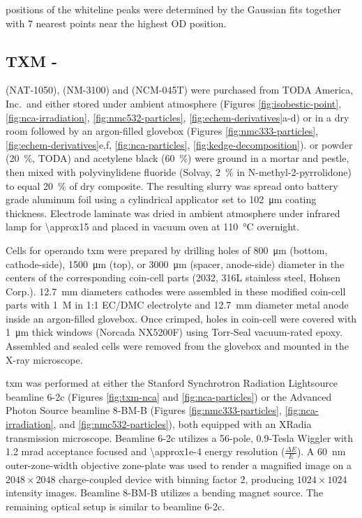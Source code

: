 \documentclass{article}
\begin{document}
positions of the whiteline peaks were determined by the Gaussian fits together with 7 nearest points near the highest OD position.

\subsection{TXM - \nmc{}}

\nca{} (NAT-1050), \nmc[333]{} (NM-3100) and \nmc[532]{} (NCM-045T)
were purchased from TODA America, Inc.\ and either stored under
ambient atmosphere (Figures \ref{fig:isobestic-point},
\ref{fig:nca-irradiation}, \ref{fig:nmc532-particles},
\ref{fig:echem-derivatives}a-d) or in a dry room followed by an
argon-filled glovebox (Figures \ref{fig:nmc333-particles},
\ref{fig:echem-derivatives}e,f, \ref{fig:nca-particles},
\ref{fig:kedge-decomposition}). \nca{} or \nmc{} powder
(\SI{20}{\percent}, TODA) and acetylene black (\SI{60}{\percent}) were
ground in a mortar and pestle, then mixed with polyvinylidene fluoride
(Solvay, \SI{2}{\percent} in N-methyl-2-pyrrolidone) to equal
\SI{20}{\percent} of dry composite. The resulting slurry was spread
onto battery grade aluminum foil using a cylindrical applicator set to
\SI{102}{\micro\meter} coating thickness. Electrode laminate was dried
in ambient atmosphere under infrared lamp for \SI{\approx15}{\min} and
placed in vacuum oven at \SI{110}{\celsius} overnight.

Cells for operando \gls{txm} were prepared by drilling holes of
\SI{800}{\micro\meter} (bottom, cathode-side), \SI{1500}{\micro\meter}
(top), or \SI{3000}{\micro\meter} (spacer, anode-side) diameter in the
centers of the corresponding coin-cell parts (2032, 316L stainless
steel, Hohsen Corp.). \SI{12.7}{\milli\meter} diameters cathodes were
assembled in these modified coin-cell parts with \SI{1}{M} 
in 1:1 EC/DMC electrolyte and \SI{12.7}{\milli\meter} diameter 
metal anode inside an argon-filled glovebox. Once crimped, holes in
coin-cell were covered with \SI{1}{\micro\meter} thick 
windows (Norcada NX5200F) using Torr-Seal vacuum-rated
epoxy. Assembled and sealed cells were removed from the glovebox and
mounted in the X-ray microscope.

\gls{txm} was performed at either the Stanford Synchrotron Radiation
Lightsource beamline 6-2c (Figures \ref{fig:txm-nca} and
\ref{fig:nca-particles}) or the Advanced Photon Source beamline 8-BM-B
(Figures \ref{fig:nmc333-particles}, \ref{fig:nca-irradiation}, and
\ref{fig:nmc532-particles}), both equipped with an XRadia transmission
microscope. Beamline 6-2c utilizes a 56-pole, 0.9-Tesla Wiggler with
1.2 mrad acceptance focused and \num{\approx1e-4} energy resolution
($\frac{\Delta E}{E}$). A \SI{60}{nm} outer-zone-width objective
zone-plate was used to render a magnified image on a $2048 \times
2048$ charge-coupled device with binning factor 2, producing $1024
\times 1024$ intensity images. Beamline 8-BM-B utilizes a bending
magnet source. The remaining optical setup is similar to beamline
6-2c.
\end{document}
